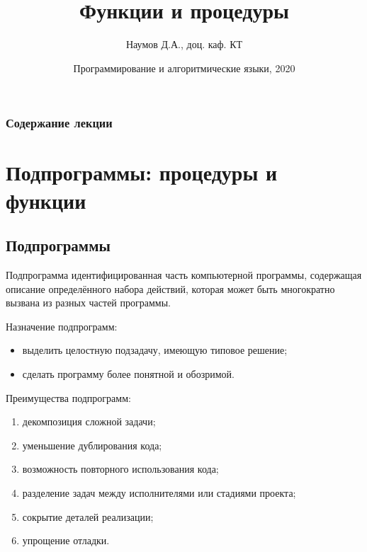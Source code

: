 \documentclass{beamer}
\title[Подпрограммы]{Функции и процедуры}
\author{Наумов Д.А., доц. каф. КТ}
\date[13.03.2020] {Программирование и алгоритмические языки, 2020}
\begin{document}
\begin{frame}
  \titlepage
\end{frame}
  
\begin{frame}
  \frametitle{Содержание лекции}
  \tableofcontents  
\end{frame}
  
\section{Подпрограммы: процедуры и функции}
\subsection{Подпрограммы}
\begin{frame}
\begin{block}{Подпрограмма}
идентифицированная часть компьютерной программы, содержащая описание определённого набора действий, которая может быть многократно вызвана из разных частей программы.
\end{block}
Назначение подпрограмм:
\begin{itemize}
\item выделить целостную подзадачу, имеющую типовое решение;
\item сделать программу более понятной и обозримой.
\end{itemize}
Преимущества подпрограмм:
\begin{enumerate}
\item декомпозиция сложной задачи;
\item уменьшение дублирования кода;
\item возможность повторного использования кода;
\item разделение задач между исполнителями или стадиями проекта;
\item сокрытие деталей реализации;
\item упрощение отладки.
\end{enumerate}
\end{frame} 
\end{document}
